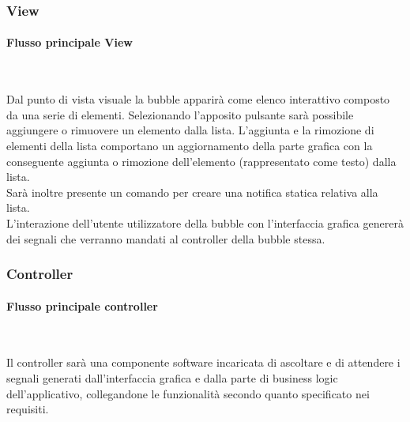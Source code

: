 \subsubsection{View}
\begin{samepage}
	\paragraph{Flusso principale View}\mbox{}\\
\end{samepage}
Dal punto di vista visuale la bubble apparirà come elenco interattivo composto da una serie di elementi. Selezionando l'apposito pulsante sarà possibile aggiungere o rimuovere un elemento dalla lista. L'aggiunta e la rimozione di elementi della lista comportano un aggiornamento della parte grafica con la conseguente aggiunta o rimozione dell'elemento (rappresentato come testo) dalla lista.\\
Sarà inoltre presente un comando per creare una notifica statica relativa alla lista.\\
L'interazione dell'utente utilizzatore della bubble con l'interfaccia grafica genererà dei segnali che verranno mandati al controller della bubble stessa.

\subsubsection{Controller}
\begin{samepage}
	\paragraph{Flusso principale controller}\mbox{}\\
\end{samepage}

Il controller sarà una componente software incaricata di ascoltare e di attendere i segnali generati dall'interfaccia grafica e dalla parte di business logic dell'applicativo, collegandone le funzionalità secondo quanto specificato nei requisiti. 

